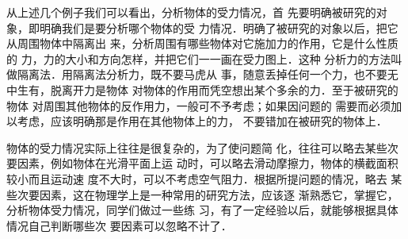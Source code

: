     从上述几个例子我们可以看出，分析物体的受力情况，首
先要明确被研究的对象，即明确我们是要分析哪个物体的受
力情况．明确了被研究的对象以后，把它从周围物体中隔离出
来，分析周围有哪些物体对它施加力的作用，它是什么性质的
力，力的大小和方向怎样，并把它们一一画在受力图上．这种
分析力的方法叫做\textsf{隔离法}．用隔离法分析力，既不要马虎从
事，随意丢掉任何一个力，也不要无中生有，脱离开力是物体
对物体的作用而凭空想出某个多余的力．至于被研究的物体
对周围其他物体的反作用力，一般可不予考虑；如果因问题的
需要而必须加以考虑，应该明确那是作用在其他物体上的力，
不要错加在被研究的物体上．

    物体的受力情况实际上往往是很复杂的，为了使问题简
化，往往可以略去某些次要因素，例如物体在光滑平面上运
动时，可以略去滑动摩擦力，物体的横截面积较小而且运动速
度不大时，可以不考虑空气阻力．根据所提问题的情况，略去
某些次要因素，这在物理学上是一种常用的研究方法，应该逐
渐熟悉它，掌握它，分析物体受力情况，同学们做过一些练
习，有了一定经验以后，就能够根据具体情况自己判断哪些次
要因素可以忽略不计了．

